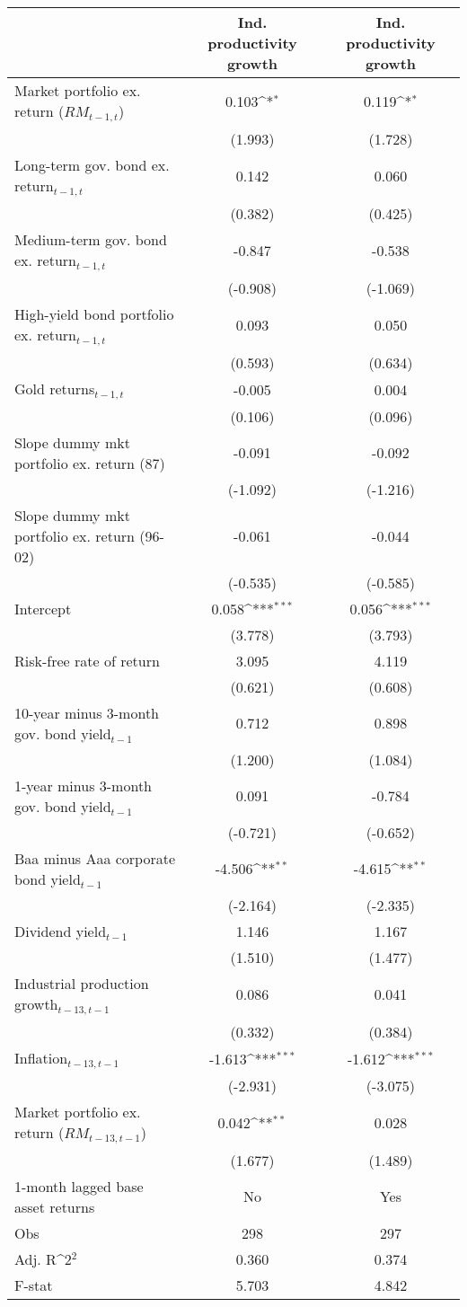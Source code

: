 {
\def\sym#1{\ifmmode^{#1}\else\(^{#1}\)\fi}
\begin{tabular}{@{\extracolsep{2pt}}l*{2}{c}@{}}
\hline\hline


 & Ind. productivity growth & Ind. productivity growth \\
\hline
Market portfolio ex. return ($RM_{t-1,t}$) & 0.103\sym{*} & 0.119\sym{*} \\
 & (1.993) & (1.728) \\
Long-term gov. bond ex. return$_{t-1,t}$ & 0.142 & 0.060 \\
 & (0.382) & (0.425) \\
Medium-term gov. bond ex. return$_{t-1,t}$ & -0.847 & -0.538 \\
 & (-0.908) & (-1.069) \\
High-yield bond portfolio ex. return$_{t-1,t}$ & 0.093 & 0.050 \\
 & (0.593) & (0.634) \\
Gold returns$_{t-1,t}$ & -0.005 & 0.004 \\
 & (0.106) & (0.096) \\
Slope dummy mkt portfolio ex. return (87) & -0.091 & -0.092 \\
 & (-1.092) & (-1.216) \\
Slope dummy mkt portfolio ex. return (96-02) & -0.061 & -0.044 \\
 & (-0.535) & (-0.585) \\
Intercept & 0.058\sym{***} & 0.056\sym{***} \\
 & (3.778) & (3.793) \\
Risk-free rate of return & 3.095 & 4.119 \\
 & (0.621) & (0.608) \\
10-year minus 3-month gov. bond yield$_{t-1}$ & 0.712 & 0.898 \\
 & (1.200) & (1.084) \\
1-year minus 3-month gov. bond yield$_{t-1}$ & 0.091 & -0.784 \\
 & (-0.721) & (-0.652) \\
Baa minus Aaa corporate bond yield$_{t-1}$ & -4.506\sym{**} & -4.615\sym{**} \\
 & (-2.164) & (-2.335) \\
Dividend yield$_{t-1}$ & 1.146 & 1.167 \\
 & (1.510) & (1.477) \\
Industrial production growth$_{t-13,t-1}$ & 0.086 & 0.041 \\
 & (0.332) & (0.384) \\
Inflation$_{t-13,t-1}$ & -1.613\sym{***} & -1.612\sym{***} \\
 & (-2.931) & (-3.075) \\
Market portfolio ex. return ($RM_{t-13,t-1}$) & 0.042\sym{**} & 0.028 \\
 & (1.677) & (1.489) \\
1-month lagged base asset returns & No & Yes \\

\hline
Obs & 298 & 297 \\
Adj. R\sym{2} & 0.360 & 0.374 \\
F-stat & 5.703 & 4.842 \\
\hline\hline
\end{tabular}
}